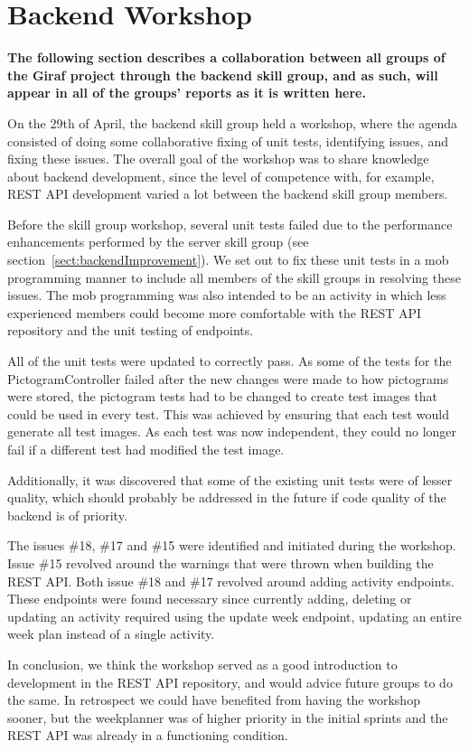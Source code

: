 \section{Backend Workshop}

\textbf{The following section describes a collaboration between all groups of the Giraf project through the backend skill group, and as such, will appear in all of the groups' reports as it is written here.}

On the 29th of April, the backend skill group held a workshop, where the agenda consisted of doing some collaborative fixing of unit tests, identifying issues, and fixing these issues. The overall goal of the workshop was to share knowledge about backend development, since the level of competence with, for example, REST API development varied a lot between the backend skill group members.

Before the skill group workshop, several unit tests failed due to the performance enhancements performed by the server skill group (see section~\ref{sect:backendImprovement}). We set out to fix these unit tests in a mob programming manner to include all members of the skill groups in resolving these issues. The mob programming was also intended to be an activity in which less experienced members could become more comfortable with the REST API repository and the unit testing of endpoints.

All of the unit tests were updated to correctly pass. As some of the tests for the PictogramController failed after the new changes were made to how pictograms were stored, the pictogram tests had to be changed to create test images that could be used in every test. This was achieved by ensuring that each test would generate all test images. As each test was now independent, they could no longer fail if a different test had modified the test image.

Additionally, it was discovered that some of the existing unit tests were of lesser quality, which should probably be addressed in the future if code quality of the backend is of priority.

The issues \#18, \#17 and \#15 were identified and initiated during the workshop. Issue \#15 revolved around the warnings that were thrown when building the REST API. Both issue \#18 and \#17 revolved around adding activity endpoints. These endpoints were found necessary since currently adding, deleting or updating an activity required using the update week endpoint, updating an entire week plan instead of a single activity. 
 
In conclusion, we think the workshop served as a good introduction to development in the REST API repository, and would advice future groups to do the same. In retrospect we could have benefited from having the workshop sooner, but the weekplanner was of higher priority in the initial sprints and the REST API was already in a functioning condition.
